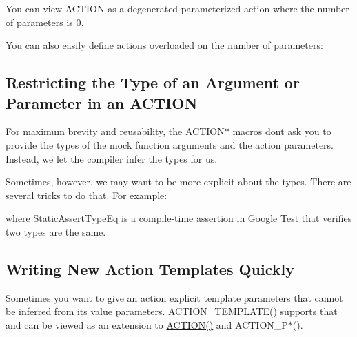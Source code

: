 You can view {\ttfamily A\+C\+T\+I\+ON} as a degenerated parameterized action where the number of parameters is 0.

You can also easily define actions overloaded on the number of parameters\+: 
\begin{DoxyCode}{0}
\end{DoxyCode}


\subsection*{Restricting the Type of an Argument or Parameter in an A\+C\+T\+I\+ON}

For maximum brevity and reusability, the {\ttfamily A\+C\+T\+I\+O\+N$\ast$} macros don\textquotesingle{}t ask you to provide the types of the mock function arguments and the action parameters. Instead, we let the compiler infer the types for us.

Sometimes, however, we may want to be more explicit about the types. There are several tricks to do that. For example\+: 
\begin{DoxyCode}{0}
\DoxyCodeLine{\}}
\DoxyCodeLine{}
\DoxyCodeLine{}
\DoxyCodeLine{\}}
\end{DoxyCode}
 where {\ttfamily Static\+Assert\+Type\+Eq} is a compile-\/time assertion in Google Test that verifies two types are the same.

\subsection*{Writing New Action Templates Quickly}

Sometimes you want to give an action explicit template parameters that cannot be inferred from its value parameters. {\ttfamily \mbox{\hyperlink{googletest-master_2googlemock_2include_2gmock_2gmock-generated-actions_8h_ad04fa741f313f0c23924d61fcfb1536d}{A\+C\+T\+I\+O\+N\+\_\+\+T\+E\+M\+P\+L\+A\+T\+E()}}} supports that and can be viewed as an extension to {\ttfamily \mbox{\hyperlink{googletest-master_2googlemock_2include_2gmock_2gmock-generated-actions_8h_a7af7137aa4871df4235881af377205fe}{A\+C\+T\+I\+O\+N()}}} and {\ttfamily A\+C\+T\+I\+O\+N\+\_\+\+P$\ast$()}.


